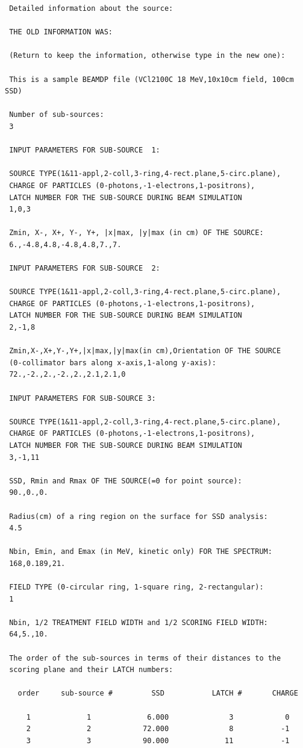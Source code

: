 \documentclass[12pt,twoside]{article}
\begin{document}
\begin{verbatim}
 Detailed information about the source:

 THE OLD INFORMATION WAS:

 (Return to keep the information, otherwise type in the new one):

 This is a sample BEAMDP file (VCl2100C 18 MeV,10x10cm field, 100cm SSD)

 Number of sub-sources:
 3

 INPUT PARAMETERS FOR SUB-SOURCE  1:

 SOURCE TYPE(1&11-appl,2-coll,3-ring,4-rect.plane,5-circ.plane),
 CHARGE OF PARTICLES (0-photons,-1-electrons,1-positrons),
 LATCH NUMBER FOR THE SUB-SOURCE DURING BEAM SIMULATION
 1,0,3

 Zmin, X-, X+, Y-, Y+, |x|max, |y|max (in cm) OF THE SOURCE:
 6.,-4.8,4.8,-4.8,4.8,7.,7.

 INPUT PARAMETERS FOR SUB-SOURCE  2:

 SOURCE TYPE(1&11-appl,2-coll,3-ring,4-rect.plane,5-circ.plane),
 CHARGE OF PARTICLES (0-photons,-1-electrons,1-positrons),
 LATCH NUMBER FOR THE SUB-SOURCE DURING BEAM SIMULATION
 2,-1,8

 Zmin,X-,X+,Y-,Y+,|x|max,|y|max(in cm),Orientation OF THE SOURCE
 (0-collimator bars along x-axis,1-along y-axis):
 72.,-2.,2.,-2.,2.,2.1,2.1,0

 INPUT PARAMETERS FOR SUB-SOURCE 3:

 SOURCE TYPE(1&11-appl,2-coll,3-ring,4-rect.plane,5-circ.plane),
 CHARGE OF PARTICLES (0-photons,-1-electrons,1-positrons),
 LATCH NUMBER FOR THE SUB-SOURCE DURING BEAM SIMULATION
 3,-1,11

 SSD, Rmin and Rmax OF THE SOURCE(=0 for point source):
 90.,0.,0.

 Radius(cm) of a ring region on the surface for SSD analysis:
 4.5

 Nbin, Emin, and Emax (in MeV, kinetic only) FOR THE SPECTRUM:
 168,0.189,21.

 FIELD TYPE (0-circular ring, 1-square ring, 2-rectangular):
 1

 Nbin, 1/2 TREATMENT FIELD WIDTH and 1/2 SCORING FIELD WIDTH:
 64,5.,10.

 The order of the sub-sources in terms of their distances to the
 scoring plane and their LATCH numbers:

   order     sub-source #         SSD           LATCH #       CHARGE

     1             1           	 6.000              3            0
     2             2            72.000              8           -1
     3             3            90.000             11           -1


\end{verbatim}
\end{document}
